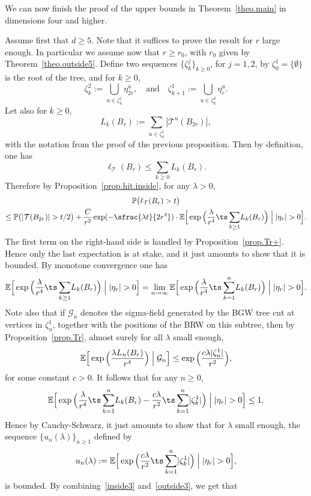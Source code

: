 We can now finish the proof of the upper bounds in Theorem~\ref{theo.main}
in dimensions four and higher.

Assume first that $d\ge 5$. Note that it suffices to prove the result for $r$ large enough. In particular we assume now that $r\ge r_0$, with $r_0$ given by Theorem~\ref{theo.outside5}. Define two sequences $\{\zeta_k^j\}_{k\ge 0}$, for $j=1,2$, by $\zeta_0^1 = \{\emptyset\}$ is the root of the tree, and for $k\ge 0$,
\[
\zeta_k^2 := \bigcup_{u\in \zeta_k^1} \eta^u_{2r},
\quad \text{and}\quad \zeta_{k+1}^1 := \bigcup_{u\in \zeta_k^2} \eta^u_r.
\]
Let also for $k\ge 0$,
\[
L_k(B_r) := \sum_{u\in \zeta_k^1} |\mathcal T^u(B_{2r})|,
\]
with the notation from the proof of the previous proposition. Then by definition, one has
\[
\ell_{\mathcal T}(B_r) \le \sum_{k\ge 0} L_k(B_r).
\]
Therefore by Proposition~\ref{prop.hit.inside}, for any $\lambda>0$,
\begin{multline*}
\mathbb P\big(\ell_{\mathcal T}(B_r)>t\big)\\
\le
\mathbb P\big(|\mathcal T(B_{2r})|>t/2\big) +
\frac{C}{r^2}\exp(-\sfrac{\lambda t}{2r^4})\cdot \mathbb E\Big[\exp\Big(\frac{\lambda}{r^4}{\ts\sum_{k\ge 1}} L_k(B_r)\Big)\Bigm||\eta_r|> 0 \Big].
\end{multline*}
The first term on the right-hand side is handled by Proposition~\ref{prop.Tr+}. Hence only the last expectation is at stake, and it just
amounts to show that it is bounded. By monotone convergence one has
\[
\mathbb E\Big[\exp\Big(\frac{\lambda}{r^4}{\ts\sum_{k\ge 1}}L_k(B_r)\Big)\Bigm| |\eta_r|> 0 \Big] = \lim_{n\to \infty} \mathbb E\Big[\exp\Big(\frac{\lambda}{r^4}{\ts\sum_{k=1}^n} L_k(B_r)\Big)\Bigm||\eta_r|> 0 \Big].
\]
Note also that if $\mathcal G_n$ denotes the
sigma-field generated by the BGW tree cut at vertices in $\zeta_n^1$,
together with the positions of the BRW on this subtree, then by Proposition~\ref{prop.Tr}, almost surely for all $\lambda$ small enough,
\[
\mathbb E\Big[\exp\Big(\frac{\lambda L_n(B_r)}{r^4}\Big)\Bigm|\mathcal G_n \Big] \le \exp\Big(\frac{c\lambda |\zeta_n^1|}{r^2}\Big),
\]
for some constant $c>0$. It follows that for any $n\ge 0$,
\[
\mathbb E\Big[\exp\Big(\frac{\lambda}{r^4}{\ts\sum_{k=1}^n} L_k(B_r) - \frac{c\lambda}{r^2}{\ts\sum_{k=1}^n} |\zeta_k^1| \Big)\Bigm||\eta_r|> 0 \Big]\le 1.
\]
Hence by Cauchy-Schwarz, it just amounts to show that for $\lambda$ small enough, the sequence $\{u_n(\lambda)\}_{n\ge 1}$ defined by
\[
u_n(\lambda):=\mathbb E\Big[\exp\Big(\frac{c\lambda}{r^2}{\ts\sum_{k=1}^n} |\zeta_k^1| \Big)\Bigm||\eta_r|> 0 \Big],
\]
is bounded. By combining~\eqref{inside3} and~\eqref{outside3}, we get that
